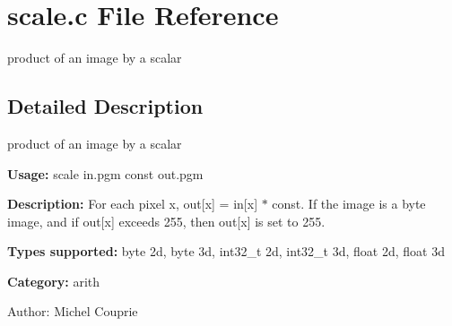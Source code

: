 \section{scale.c File Reference}
\label{scale_8c}
product of an image by a scalar 



\subsection{Detailed Description}
product of an image by a scalar 

{\bf Usage:} scale in.pgm const out.pgm

{\bf Description:} For each pixel x, out[x] = in[x] $\ast$ const. If the image is a byte image, and if out[x] exceeds 255, then out[x] is set to 255.

{\bf Types supported:} byte 2d, byte 3d, int32\_\-t 2d, int32\_\-t 3d, float 2d, float 3d

{\bf Category:} arith

\begin{Desc}
\item[Author:]Michel Couprie \end{Desc}
